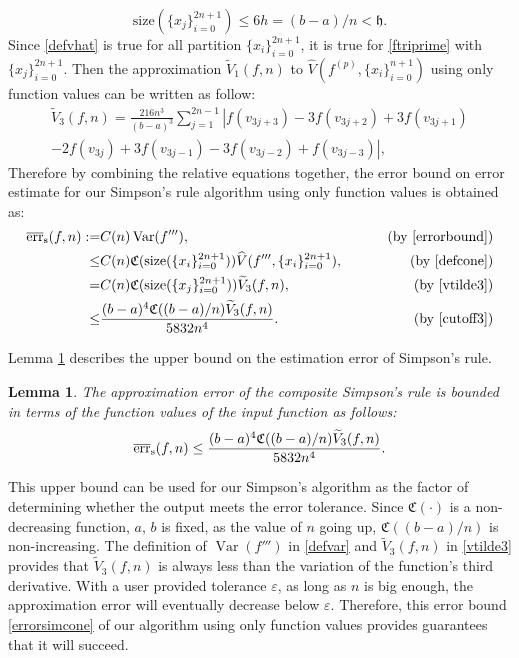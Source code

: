 \documentclass{iitthesis}
\DeclareMathOperator{\Var}{Var}
\newtheorem{lem}{Lemma}
\theoremstyle{definition}
\theoremstyle{remark}
\begin{document}
\begin{equation}\label{cutoff3}
    \text{size}(\{x_j\}_{i=0}^{2n+1})\leq 6h=(b-a)/n<\mathfrak{h}.
\end{equation}
Since \eqref{defvhat} is true for all partition $\{x_i\}_{i=0}^{2n+1}$, it is true for \eqref{ftriprime} with $\{x_j\}_{i=0}^{2n+1}$. Then the approximation $\widetilde{V}_1(f,n)$ to $\widehat{V}(f^{(p)},\{x_i\}_{i=0}^{n+1})$ using only function values can be written as follow:
\begin{multline}\label{vtilde3}
\widetilde{V}_3(f,n)=\frac{216n^3}{(b-a)^3}\sum_{j=1}^{2n-1}\left|f(v_{3j+3})-3f(v_{3j+2})+3f(v_{3j+1})\right.\\\left.-2f(v_{3j})+3f(v_{3j-1})-3f(v_{3j-2})+f(v_{3j-3})\right|,
\end{multline}
Therefore by combining the relative equations together, the error bound on error estimate for our Simpson's rule algorithm using only function values is obtained as:
\begin{align*}
\overline{\text{err}}_{\text{s}}(f,n):=&C(n)\Var(f'''),\qquad &\text{ (by \eqref{errorbound})}\\
\leq & C(n)\mathfrak{C}(\text{size}(\{x_i\}_{i=0}^{2n+1}))\widehat{V}(f''',\{x_i\}_{i=0}^{2n+1}), \qquad &\text{ (by \eqref{defcone})}\\
=& C(n)\mathfrak{C}(\text{size}(\{x_j\}_{i=0}^{2n+1}))\widetilde{V}_3(f,n), \qquad &\text{ (by \eqref{vtilde3})}\\
  \leq & \frac{(b-a)^4\mathfrak{C}((b-a)/n)\widetilde{V}_3(f,n)}{5832n^4}.\qquad &\text{ (by \eqref{cutoff3})}
\end{align*}

Lemma \ref{lemmaerrorboundsim} describes the upper bound on the estimation error of Simpson's rule.
\begin{lem}\label{lemmaerrorboundsim}
    The approximation error of the composite Simpson's rule is bounded in terms of the function values of the input function as follows:
    \begin{equation}\label{errorsimcone}
      \overline{\textup{err}}_{\text{s}}(f,n)\leq \frac{(b-a)^4\mathfrak{C}((b-a)/n)\widetilde{V}_3(f,n)}{5832n^4}.
    \end{equation}
\end{lem}


This upper bound can be used for our Simpson's algorithm as the factor of determining whether the output meets the error tolerance. Since $\mathfrak{C}(\cdot)$ is a non-decreasing function, $a$, $b$ is fixed, as the value of $n$ going up, $\mathfrak{C}((b-a)/n)$ is non-increasing. The definition of $\Var(f''')$ in \eqref{defvar} and $\widetilde{V}_3(f,n)$ in \eqref{vtilde3} provides that $\widetilde{V}_3(f,n)$ is always less than the variation of the function's third derivative. With a user provided tolerance $\varepsilon$, as long as $n$ is big enough, the approximation error will eventually decrease below $\varepsilon$.  Therefore, this error bound \eqref{errorsimcone} of our algorithm using only function values provides guarantees that it will succeed.
\end{document}
